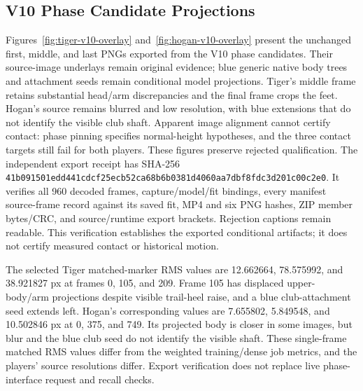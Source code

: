 \documentclass[11pt,letterpaper]{article}
\newcommand{\hash}[1]{{\footnotesize\nolinkurl{#1}}}
\begin{document}
\subsection{V10 Phase Candidate Projections}
Figures~\ref{fig:tiger-v10-overlay} and~\ref{fig:hogan-v10-overlay} present the
unchanged first, middle, and last PNGs exported from the V10 phase candidates.
Their source-image underlays remain original evidence; blue generic native
body trees and attachment seeds remain conditional model projections.
Tiger's middle frame retains substantial head/arm discrepancies and the final
frame crops the feet. Hogan's source remains blurred and low resolution, with
blue extensions that do not identify the visible club shaft. Apparent image
alignment cannot certify contact: phase pinning specifies normal-height
hypotheses, and the three contact targets still fail for both players.
These figures preserve rejected qualification. The independent export receipt
 has SHA-256
\hash{41b091501edd441cdcf25ecb52ca68b6b0381d4060aa7dbf8fdc3d201c00c2e0}.
It verifies all 960 decoded frames, capture/model/fit bindings, every manifest
source-frame record against its saved fit, MP4 and six PNG hashes, ZIP member
bytes/CRC, and source/runtime export brackets. Rejection captions remain
readable. This verification establishes the exported conditional artifacts;
it does not certify measured contact or historical motion.

The selected Tiger matched-marker RMS values are 12.662664, 78.575992, and
38.921827 px at frames 0, 105, and 209. Frame 105 has displaced upper-body/arm
projections despite visible trail-heel raise, and a blue club-attachment seed
extends left. Hogan's corresponding values are 7.655802, 5.849548, and
10.502846 px at 0, 375, and 749. Its projected body is closer in some images,
but blur and the blue club seed do not identify the visible shaft. These
single-frame matched RMS values differ from the weighted training/dense job
metrics, and the players' source resolutions differ. Export verification does
not replace live phase-interface request and recall checks.
\end{document}
